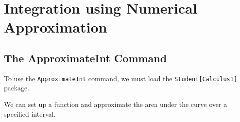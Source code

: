 \chapter{Integration using Numerical Approximation}
\label{chp:integration_using_numerical_approximation}

\section{The ApproximateInt Command}

To use the \texttt{ApproximateInt} command, we must load the \texttt{Student[Calculus1]} package.
\begin{maplegroup}
\begin{mapleinput}
\end{mapleinput}
\end{maplegroup}

We can set up a function and approximate the area under the curve over a specified interval.

\begin{maplegroup}
\begin{mapleinput}
\end{mapleinput}
\mapleresult
\begin{maplelatex}
\end{maplelatex}
\end{maplegroup}

\begin{maplegroup}
\begin{mapleinput}
\end{mapleinput}
\mapleresult
{}
\end{maplegroup}

\begin{maplegroup}
\begin{mapleinput}
\end{mapleinput}
\mapleresult
\begin{maplelatex}
\end{maplelatex}
\end{maplegroup}

